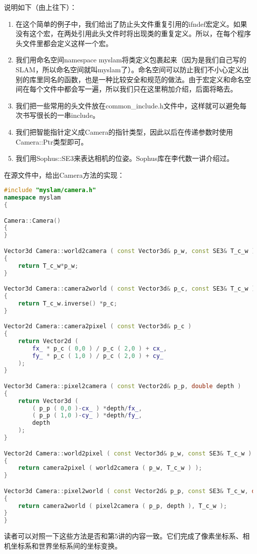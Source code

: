 说明如下（由上往下）：
\begin{enumerate}
	\item 在这个简单的例子中，我们给出了防止头文件重复引用的ifndef宏定义。如果没有这个宏，在两处引用此头文件时将出现类的重复定义。所以，在每个程序头文件里都会定义这样一个宏。
	\item 我们用命名空间namespace myslam将类定义包裹起来（因为是我们自己写的SLAM，所以命名空间就叫myslam了）。命名空间可以防止我们不小心定义出别的库里同名的函数，也是一种比较安全和规范的做法。由于宏定义和命名空间在每个文件中都会写一遍，所以我们只在这里稍加介绍，后面将略去。
	\item 我们把一些常用的头文件放在common\_include.h文件中，这样就可以避免每次书写很长的一串include。
	\item 我们把智能指针定义成Camera的指针类型，因此以后在传递参数时使用Camera::Ptr类型即可。
	\item 我们用Sophus::SE3来表达相机的位姿。Sophus库在李代数一讲介绍过。
\end{enumerate}

在源文件中，给出Camera方法的实现：
\begin{lstlisting}[language=c++,caption=slambook/project/0.1/src/camera.cpp]
#include "myslam/camera.h"
namespace myslam
{

Camera::Camera()
{
}

Vector3d Camera::world2camera ( const Vector3d& p_w, const SE3& T_c_w )
{
	return T_c_w*p_w;
}

Vector3d Camera::camera2world ( const Vector3d& p_c, const SE3& T_c_w )
{
	return T_c_w.inverse() *p_c;
}

Vector2d Camera::camera2pixel ( const Vector3d& p_c )
{
	return Vector2d (
		fx_ * p_c ( 0,0 ) / p_c ( 2,0 ) + cx_,
		fy_ * p_c ( 1,0 ) / p_c ( 2,0 ) + cy_
	);
}

Vector3d Camera::pixel2camera ( const Vector2d& p_p, double depth )
{
	return Vector3d (
		( p_p ( 0,0 )-cx_ ) *depth/fx_,
		( p_p ( 1,0 )-cy_ ) *depth/fy_,
		depth
	);
}

Vector2d Camera::world2pixel ( const Vector3d& p_w, const SE3& T_c_w )
{
	return camera2pixel ( world2camera ( p_w, T_c_w ) );
}

Vector3d Camera::pixel2world ( const Vector2d& p_p, const SE3& T_c_w, double depth )
{
	return camera2world ( pixel2camera ( p_p, depth ), T_c_w );
}
}
\end{lstlisting}

读者可以对照一下这些方法是否和第5讲的内容一致。它们完成了像素坐标系、相机坐标系和世界坐标系间的坐标变换。

